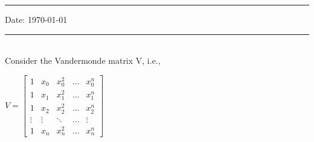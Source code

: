 \documentclass[letterpaper]{exam}
\begin{document}
\hrule
\vspace{3mm}
\noindent 
\vspace{3mm}

\noindent
{{\sf Date: \today }} %



\vspace{3mm}
\hrule
\begin{questions}
\\Consider the Vandermonde matrix V, i.e.,
\begin{center}
$V = \begin{bmatrix}
1&x_{0}&x_{0}^{2}&\ldots&x_{0}^{n}\\
1&x_{1}&x_{1}^{2}&\ldots&x_{1}^{n}\\
1&x_{2}&x_{2}^{2}&\ldots&x_{2}^{n}\\
\vdots&\vdots&\ddots&\ldots&\vdots\\
1&x_{n}&x_{n}^{2}&\ldots&x_{n}^{n}
\end{bmatrix}$
\end{center}
\begin{parts}

\end{parts}
\end{questions}
\end{document}
